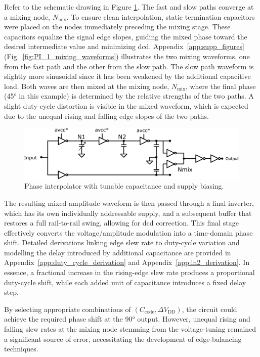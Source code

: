 Refer to the schematic drawing in Figure \ref{fig:PI_1_schematic}. The fast and slow paths converge at a mixing node, $N_\text{mix}$. To ensure clean interpolation, static termination capacitors were placed on the nodes immediately preceding the mixing stage. These capacitors equalize the signal edge slopes, guiding the mixed phase toward the desired intermediate value and minimizing \gls{dcd}.
Appendix~\ref{app:supp_figures} (Fig.~\ref{fig:PI_1_mixing_waveforms}) illustrates the two mixing waveforms, one from the fast path and the other from the slow path. The slow path waveform is slightly more sinusoidal since it has been weakened by the additional capacitive load. Both waves are then mixed at the mixing node, $N_\text{mix}$, where the final phase (\ang{45} in this example) is determined by the relative strengths of the two paths. A slight duty-cycle distortion is visible in the mixed waveform, which is expected due to the unequal rising and falling edge slopes of the two paths.
\begin{figure}[htbp]
  \centering
  \includegraphics[width=0.8\linewidth]{figures/Schematics/clock_generation_half_V0.png}
  \caption{Phase interpolator with tunable capacitance and supply biasing.}
  \label{fig:PI_1_schematic}
\end{figure}

The resulting mixed-amplitude waveform is then passed through a final inverter, which has its own individually addressable supply, and a subsequent buffer that restores a full rail-to-rail swing, allowing for \gls{dcd} correction. This final stage effectively converts the voltage/amplitude modulation into a time-domain phase shift. Detailed derivations linking edge slew rate to duty-cycle variation and modelling the delay introduced by additional capacitance are provided in Appendix~\ref{app:duty_cycle_derivation} and Appendix~\ref{app:ln2_derivation}. In essence, a fractional increase in the rising-edge slew rate produces a proportional duty-cycle shift, while each added unit of capacitance introduces a fixed delay step.

By selecting appropriate combinations of $(C_\text{code},\Delta V_\text{DD})$, the circuit could achieve the required phase shift at the \ang{90} output. However, unequal rising and falling slew rates at the mixing node stemming from the voltage-tuning remained a significant source of error, necessitating the development of edge-balancing techniques.

